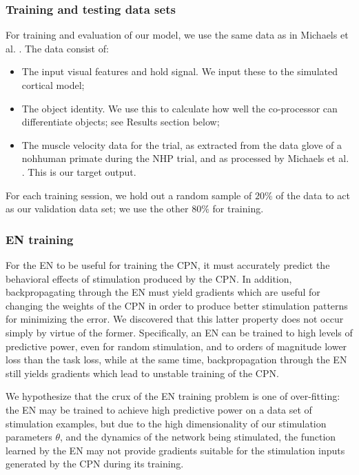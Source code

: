 \documentclass[12pt]{iopart}
\begin{document}
\subsubsection{Training and testing data sets}
For training and evaluation of our model, we use the same data as in Michaels et al.
\cite{michaels.mrnn}. The data consist of:
\begin{itemize}
    \item The input visual features and hold signal. We input these to the simulated
          cortical model;
    \item The object identity. We use this to calculate how well the co-processor
          can differentiate objects; see Results section below;
    \item The muscle velocity data for the trial, as extracted from the data glove of a nohhuman primate 
          during the NHP trial, and as processed by Michaels et al.
\cite{michaels.mrnn}. This is our target output.
\end{itemize}

For each training session, we hold out a random sample of $20\%$ of the data to act as our validation data set; we
use the other $80\%$ for training.

\subsubsection{EN training}
\label{sec:en_training}

For the EN to be useful for training the CPN, it must accurately predict the behavioral effects of stimulation
produced by the CPN. In addition, backpropagating through the EN must yield gradients which are useful for
changing the weights of the CPN in order to produce better stimulation patterns for minimizing the error.
We discovered that this latter property does not occur simply by virtue of the former. Specifically, an EN
can be trained to high levels of predictive power, even for random stimulation, and to orders of magnitude
lower loss than the task loss, while at the same time,  backpropagation through the EN still yields gradients
which lead to unstable training of the CPN. 

We hypothesize that the crux of the EN training problem is one of over-fitting: the EN may be trained
to achieve high predictive power on a data set of stimulation examples, but due to 
the high dimensionality of our stimulation parameters $\theta$, and the dynamics of the
network being stimulated, the function learned by the EN may not provide gradients suitable
for the stimulation inputs generated by the CPN during its training.
\end{document}
